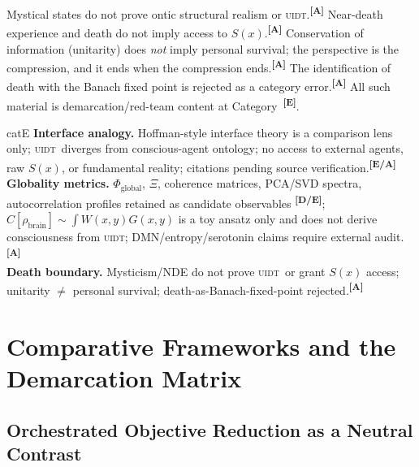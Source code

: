 \documentclass[12pt,a4paper,twoside]{article}
\theoremstyle{plain}
\theoremstyle{definition}
\theoremstyle{remark}
\newcommand{\UIDT}{\textsc{uidt}}
\newcommand{\catmark}[1]{\textsuperscript{\textsf{\textbf{[#1]}}}}
\begin{document}
\begin{governancebox}
Mystical states do not prove ontic structural realism or \UIDT.\catmark{A} Near-death experience and death do not imply access to $S(x)$.\catmark{A} Conservation of information (unitarity) does \emph{not} imply personal survival; the perspective is the compression, and it ends when the compression ends.\catmark{A} The identification of death with the Banach fixed point is rejected as a category error.\catmark{A} All such material is demarcation/red-team content at Category~\catmark{E}.
\end{governancebox}

\begin{evidencebox}{catE}
\textbf{Interface analogy.} Hoffman-style interface theory is a comparison lens only; \UIDT\ diverges from conscious-agent ontology; no access to external agents, raw $S(x)$, or fundamental reality; citations pending source
verification.\catmark{E/A}\\[0.3em]
\textbf{Globality metrics.} $\Phi_{\mathrm{global}}$, $\Xi$, coherence matrices, PCA/SVD spectra, autocorrelation profiles retained as candidate observables \catmark{D/E}; $C[\rho_{\mathrm{brain}}]\sim\int W(x,y)G(x,y)$ is a toy ansatz only and does not derive consciousness from \UIDT; DMN/entropy/serotonin claims
require external audit.\catmark{A}\\[0.3em]
\textbf{Death boundary.} Mysticism/NDE do not prove \UIDT\ or grant $S(x)$ access; unitarity $\neq$ personal survival; death-as-Banach-fixed-point rejected.\catmark{A}
\end{evidencebox}

\section{Comparative Frameworks and the Demarcation Matrix}
\label{sec:orch-or-comparison}

\subsection{Orchestrated Objective Reduction as a Neutral Contrast}
\label{subsec:orch-or}
\end{document}
